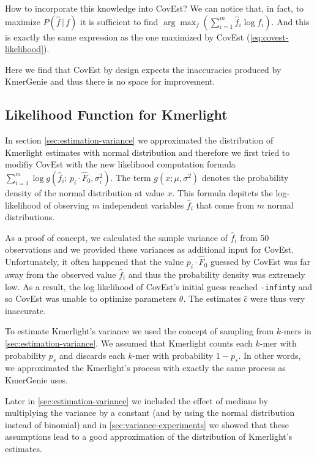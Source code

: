 \medskip

How to incorporate this knowledge into CovEst? We can notice that, in fact, to maximize 
$P(\hat f\,|\,f)$ it is sufficient to find $\arg \max_f \left(\sum_{i=1}^m \hat f_i \log f_i
\right)$. And this is exactly the same expression as the one maximized by CovEst 
(\ref{eq:covest-likelihood}).

Here we find that CovEst by design expects the inaccuracies produced by KmerGenie
and thus there is no space for improvement.




\subsection{Likelihood Function for Kmerlight}
In section \ref{sec:estimation-variance} we approximated the distribution of Kmerlight
estimates with normal distribution and therefore
we first tried to modifiy CovEst with the new likelihood computation formula 
$\sum_{i=1}^m \log g(\hat f_i;\, p_i \cdot \hat F_0, \sigma_i^2)$. The term $g(x; \mu, \sigma^2)$  
denotes the probability density of the normal distribution at value $x$. This formula depitcts the
log-likelihood of observing $m$ independent variables $\hat f_i$ that come from $m$
normal distributions.

As a proof of concept, we calculated the sample variance of $\hat f_i$ from 50 observations 
and we provided these variances as additional input for CovEst.
Unfortunately, it often happened that the value $p_i \cdot \hat F_0$ guessed by CovEst was far 
away from the observed value $\hat f_i$ and thus the probability density was extremely low. 
As a result, the log likelihood of CovEst's initial guess reached \texttt{-infinty} 
and so CovEst was unable to optimize parameters $\theta$. The estimates $\hat c$ 
were thus very inaccurate.

\medskip

To estimate Kmerlight's variance we used the concept of sampling from $k$-mers in 
\ref{sec:estimation-variance}. We assumed that Kmerlight counts each $k$-mer with probability 
$p_s$ and discards each $k$-mer with probability $1 - p_s$. In other words, we approximated 
the Kmerlight's process with exactly the same process as KmerGenie uses. 

Later in \ref{sec:estimation-variance} we included the effect of medians by multiplying the 
variance by a constant (and by using the normal distribution instead of binomial) 
and in \ref{sec:variance-experiments} we showed that these assumptions lead to a good 
approximation of the distribution of Kmerlight's estimates.

